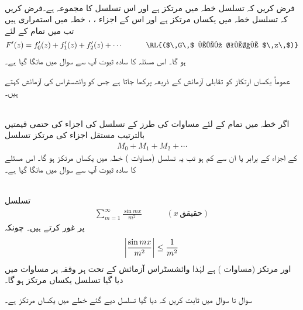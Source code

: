 \quad {}\\
فرض کریں کہ تسلسل  خطہ  میں مرتکز ہے اور اس تسلسل کا مجموعہ  ہے۔فرض کریں کہ تسلسل
  خطہ  میں یکساں مرتکز ہے اور اس کے اجزاء ، ،  خطہ  میں استمراری ہیں تب  میں تمام  کے لئے 
\begin{align*}
F'(z)=f'_0(z)+f'_1(z)+f'_2(z)+\cdots\quad \quad \quad \text{\RL{($\,G\,$ میں تمام $\,z\,$)}}
\end{align*}
ہو گا۔
اس مسئلہ کا سادہ ثبوت آپ سے سوال  میں مانگا گیا ہے۔

عموماً یکساں ارتکاز کو تقابلی آزمائش کے ذریعہ  پرکھا جاتا ہے جس کو وائشسٹراس کی آزمائش  کہتے ہیں۔

\quad {}\\
اگر خطہ  میں تمام  کے لئے مساوات  کی طرز کے تسلسل کی اجزاء کی حتمی قیمتیں بالترتیب مستقل اجزاء کی مرتکز تسلسل
\begin{align}
M_0+M_1+M_2+\cdots
\end{align} 
کے اجزاء کے برابر  یا ان سے کم ہو تب یہ تسلسل (مساوات ) خطہ میں یکساں مرتکز ہو گا۔ 
اس مسئلے کا سادہ ثبوت آپ سے سوال  میں مانگا گیا ہے۔

\quad {}\\
تسلسل
\begin{align}\label{مساوات_ٹیلر_وائشسٹراس_ایم}
\sum\limits_{m=1}^{\infty} \frac{\sin mx}{m^2}\quad \quad \quad (x\,\text{حقیقق})
\end{align}
پر غور کرتے ہیں۔ چونکہ
\begin{align*}
\abs{\frac{\sin mx}{m^2}}\le \frac{1}{m^2}
\end{align*}
 اور  مرتکز (مساوات ) ہے  لہٰذا  وائشسٹراس آزمائش  کے تحت  ہر وقفہ پر مساوات  میں دیا گیا تسلسل یکساں مرتکز  ہو گا۔

سوال  تا سوال  میں ثابت کریں کہ دیا گیا تسلسل دیے گئے خطے میں یکساں مرتکز ہے۔

